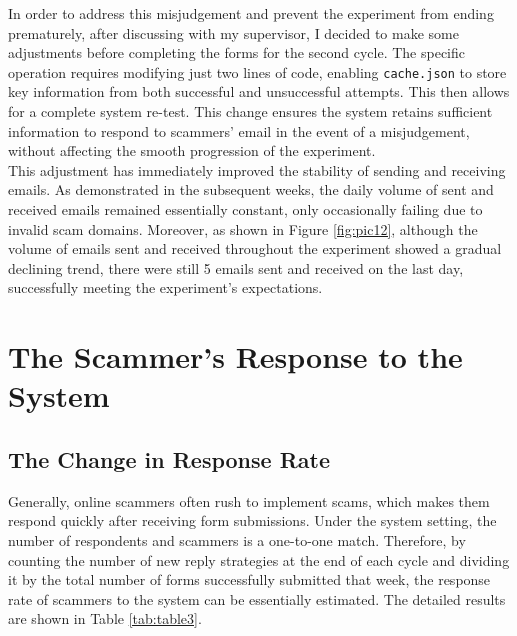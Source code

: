 \documentclass[ oneside,%
                    author={Cassie Qing Tang},
                    degree={BSc},
                     title={An Automated Response System for Disrupting Online Pet Scamming \\ },
                    subtitle={ }]{dissertation}
\begin{document}
In order to address this misjudgement and prevent the experiment from ending prematurely, after discussing with my supervisor, I decided to make some adjustments before completing the forms for the second cycle. The specific operation requires modifying just two lines of code, enabling \texttt{cache.json} to store key information from both successful and unsuccessful attempts. This then allows for a complete system re-test. This change ensures the system retains sufficient information to respond to scammers' email in the event of a misjudgement, without affecting the smooth progression of the experiment.
\\

This adjustment has immediately improved the stability of sending and receiving emails. As demonstrated in the subsequent weeks, the daily volume of sent and received emails remained essentially constant, only occasionally failing due to invalid scam domains. Moreover, as shown in Figure \ref{fig:pic12}, although the volume of emails sent and received throughout the experiment showed a gradual declining trend, there were still 5 emails sent and received on the last day, successfully meeting the experiment's expectations.

\section{The Scammer's Response to the System}
\subsection{The Change in Response Rate}
Generally, online scammers often rush to implement scams, which makes them respond quickly after receiving form submissions. Under the system setting, the number of respondents and scammers is a one-to-one match. Therefore, by counting the number of new reply strategies at the end of each cycle and dividing it by the total number of forms successfully submitted that week, the response rate of scammers to the system can be essentially estimated. The detailed results are shown in Table \ref{tab:table3}.
{\small
\begin{table}[ht]
\centering
{}
\caption{Email Response Rate of Pet Scammers to the System}
\label{tab:table3}
\end{table}
} 
\end{document}
